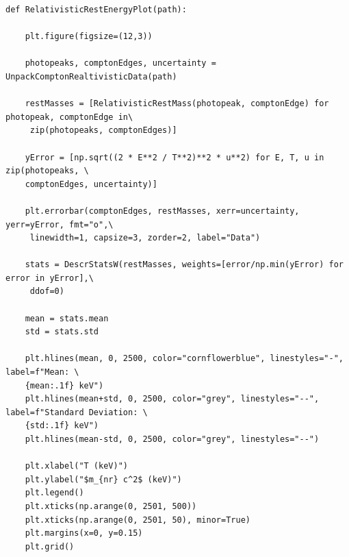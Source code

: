 \documentclass[%
reprint,
amsmath,amssymb,
aps,
floatfix
]{revtex4-2}
\begin{document}
\begin{lstlisting}
def RelativisticRestEnergyPlot(path):
    
    plt.figure(figsize=(12,3))

    photopeaks, comptonEdges, uncertainty = UnpackComptonRealtivisticData(path)

    restMasses = [RelativisticRestMass(photopeak, comptonEdge) for photopeak, comptonEdge in\
     zip(photopeaks, comptonEdges)]

    yError = [np.sqrt((2 * E**2 / T**2)**2 * u**2) for E, T, u in zip(photopeaks, \
    comptonEdges, uncertainty)]

    plt.errorbar(comptonEdges, restMasses, xerr=uncertainty, yerr=yError, fmt="o",\
     linewidth=1, capsize=3, zorder=2, label="Data")

    stats = DescrStatsW(restMasses, weights=[error/np.min(yError) for error in yError],\
     ddof=0)

    mean = stats.mean
    std = stats.std

    plt.hlines(mean, 0, 2500, color="cornflowerblue", linestyles="-", label=f"Mean: \
    {mean:.1f} keV")
    plt.hlines(mean+std, 0, 2500, color="grey", linestyles="--", label=f"Standard Deviation: \
    {std:.1f} keV")
    plt.hlines(mean-std, 0, 2500, color="grey", linestyles="--")

    plt.xlabel("T (keV)")
    plt.ylabel("$m_{nr} c^2$ (keV)")
    plt.legend()
    plt.xticks(np.arange(0, 2501, 500))
    plt.xticks(np.arange(0, 2501, 50), minor=True)
    plt.margins(x=0, y=0.15)
    plt.grid()

\end{lstlisting}

		
\end{document}
